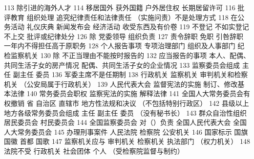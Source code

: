 \documentclass[11pt]{ctexart}
\begin{document}
113 除引进的海外人才
114 移居国外
获外国籍 户外居住权 长期居留许可
116 批评教育 组织处理 追究纪律责任和法律责任
（实施问责）不是处理方式
118 在公务活动
礼仪庆典 新闻发布会 经济活动 收受东西及有价卷
119 不登记 不如实登记 不上交 批评或纪律处分
126 除 党委领导 组织负责
127 责令辞职 免职 引咎辞职 一年内不得担任高于原职务
128 个人报告事项 专项治理部门
组织及人事部门 纪检监察机关
130 除 不正当理由不能按时报告的
132 应当报告的事项
本人、配偶、共同生活子女的房产情况
配偶、共同生活子女的企业情况
133 监察委员会组成
主任 副主任 委员
136 军委主席不是任期制
138 行政机关 监察机关 审判机关和检察机关
（公安局属于行政机关）
139 人民代表大会
监督宪法的实施
制订、修改基本法律
140 常务委员会职权
监察宪法的实施
解释法律
141 全国人大常务委员会有权撤销
省 自治区 直辖市 地方性法规和决议
（不包括特别行政区）
142 县级以上地方各级常务委员会组成
主任
副主任
委员
（没有秘书长）
143 群众自治性组织
居民委员会
村民委员会
144 全国监察委员会 对（）负责
全国人民代表大会
全国人大常务委员会
145 办理刑事案件
人民法院 检察院 公安机关
146 国家标示
国旗 国徽 首都 国歌
147 监察机关应与
审判机关
检察机关
执法部门
（权力机关）
148 法院不受
行政机关
社会团体
个人
（受检察院监督与制约）
\end{document}
